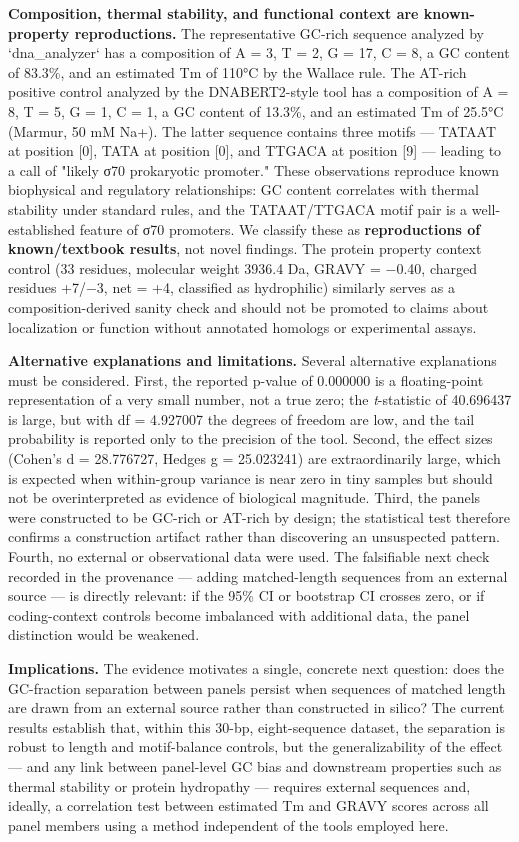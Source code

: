 \documentclass[11pt,a4paper]{article}
\begin{document}
\textbf{Composition, thermal stability, and functional context are known-property reproductions.} The representative GC-rich sequence analyzed by `dna\_analyzer` has a composition of A = 3, T = 2, G = 17, C = 8, a GC content of 83.3\%, and an estimated Tm of 110°C by the Wallace rule. The AT-rich positive control analyzed by the DNABERT2-style tool has a composition of A = 8, T = 5, G = 1, C = 1, a GC content of 13.3\%, and an estimated Tm of 25.5°C (Marmur, 50 mM Na+). The latter sequence contains three motifs — TATAAT at position [0], TATA at position [0], and TTGACA at position [9] — leading to a call of "likely σ70 prokaryotic promoter." These observations reproduce known biophysical and regulatory relationships: GC content correlates with thermal stability under standard rules, and the TATAAT/TTGACA motif pair is a well-established feature of σ70 promoters. We classify these as \textbf{reproductions of known/textbook results}, not novel findings. The protein property context control (33 residues, molecular weight 3936.4 Da, GRAVY = −0.40, charged residues +7/−3, net = +4, classified as hydrophilic) similarly serves as a composition-derived sanity check and should not be promoted to claims about localization or function without annotated homologs or experimental assays.

\textbf{Alternative explanations and limitations.} Several alternative explanations must be considered. First, the reported p-value of 0.000000 is a floating-point representation of a very small number, not a true zero; the \textit{t}-statistic of 40.696437 is large, but with df = 4.927007 the degrees of freedom are low, and the tail probability is reported only to the precision of the tool. Second, the effect sizes (Cohen's d = 28.776727, Hedges g = 25.023241) are extraordinarily large, which is expected when within-group variance is near zero in tiny samples but should not be overinterpreted as evidence of biological magnitude. Third, the panels were constructed to be GC-rich or AT-rich by design; the statistical test therefore confirms a construction artifact rather than discovering an unsuspected pattern. Fourth, no external or observational data were used. The falsifiable next check recorded in the provenance — adding matched-length sequences from an external source — is directly relevant: if the 95\% CI or bootstrap CI crosses zero, or if coding-context controls become imbalanced with additional data, the panel distinction would be weakened.

\textbf{Implications.} The evidence motivates a single, concrete next question: does the GC-fraction separation between panels persist when sequences of matched length are drawn from an external source rather than constructed in silico? The current results establish that, within this 30-bp, eight-sequence dataset, the separation is robust to length and motif-balance controls, but the generalizability of the effect — and any link between panel-level GC bias and downstream properties such as thermal stability or protein hydropathy — requires external sequences and, ideally, a correlation test between estimated Tm and GRAVY scores across all panel members using a method independent of the tools employed here.
\end{document}
